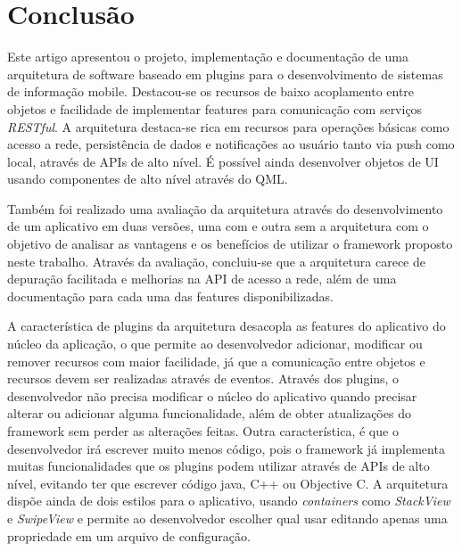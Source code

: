 \section{Conclusão}\label{sec:conclusao}
Este artigo apresentou o projeto, implementação e documentação de uma arquitetura de software baseado em plugins para o desenvolvimento de sistemas de informação mobile. Destacou-se os recursos de baixo acoplamento entre objetos e facilidade de implementar features para comunicação com serviços \textit{RESTful}. A arquitetura destaca-se rica em recursos para operações básicas como acesso a rede, persistência de dados e notificações ao usuário tanto via push como local, através de APIs de alto nível. É possível ainda desenvolver objetos de UI usando componentes de alto nível através do QML.\par

Também foi realizado uma avaliação da arquitetura através do desenvolvimento de um aplicativo em duas versões, uma com e outra sem a arquitetura com o objetivo de analisar as vantagens e os benefícios de utilizar o framework proposto neste trabalho. Através da avaliação, concluiu-se que a arquitetura carece de depuração facilitada e melhorias na API de acesso a rede, além de uma documentação para cada uma das features disponibilizadas.\par

A característica de plugins da arquitetura desacopla as features do aplicativo do núcleo da aplicação, o que permite ao desenvolvedor adicionar, modificar ou remover recursos com maior facilidade, já que a comunicação entre objetos e recursos devem ser realizadas através de eventos. Através dos plugins, o desenvolvedor não precisa modificar o núcleo do aplicativo quando precisar alterar ou adicionar alguma funcionalidade, além de obter atualizações do framework sem perder as alterações feitas. Outra característica, é que o desenvolvedor irá escrever muito menos código, pois o framework já implementa muitas funcionalidades que os plugins podem utilizar através de APIs de alto nível, evitando ter que escrever código java, C++ ou Objective C. A arquitetura dispõe ainda de dois estilos para o aplicativo, usando \textit{containers} como \textit{StackView} e \textit{SwipeView} e permite ao desenvolvedor escolher qual usar editando apenas uma propriedade em um arquivo de configuração.

